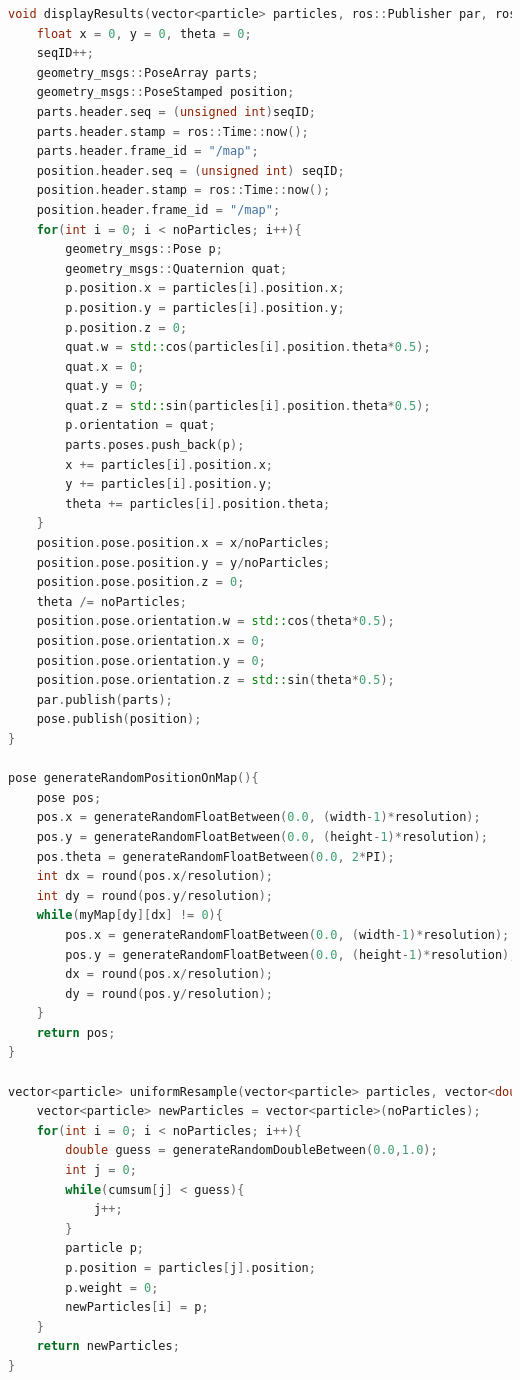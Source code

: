 \documentclass{article}
\begin{document}
\begin{appendices}
\begin{lstlisting}[language=C++]
void displayResults(vector<particle> particles, ros::Publisher par, ros::Publisher pose){
	float x = 0, y = 0, theta = 0;	
	seqID++;
	geometry_msgs::PoseArray parts;
	geometry_msgs::PoseStamped position;
	parts.header.seq = (unsigned int)seqID;
	parts.header.stamp = ros::Time::now();
	parts.header.frame_id = "/map";
	position.header.seq = (unsigned int) seqID;
	position.header.stamp = ros::Time::now();
	position.header.frame_id = "/map";
	for(int i = 0; i < noParticles; i++){
		geometry_msgs::Pose p;
		geometry_msgs::Quaternion quat;
		p.position.x = particles[i].position.x;
		p.position.y = particles[i].position.y;
		p.position.z = 0;
		quat.w = std::cos(particles[i].position.theta*0.5);
		quat.x = 0;
		quat.y = 0;
		quat.z = std::sin(particles[i].position.theta*0.5);
		p.orientation = quat;
		parts.poses.push_back(p);	
		x += particles[i].position.x;
		y += particles[i].position.y;
		theta += particles[i].position.theta;	
	}
	position.pose.position.x = x/noParticles;
	position.pose.position.y = y/noParticles;
	position.pose.position.z = 0;
	theta /= noParticles;
	position.pose.orientation.w = std::cos(theta*0.5);
	position.pose.orientation.x = 0;
	position.pose.orientation.y = 0;
	position.pose.orientation.z = std::sin(theta*0.5);
	par.publish(parts);
	pose.publish(position);
}

pose generateRandomPositionOnMap(){
	pose pos;
	pos.x = generateRandomFloatBetween(0.0, (width-1)*resolution);
	pos.y = generateRandomFloatBetween(0.0, (height-1)*resolution);
	pos.theta = generateRandomFloatBetween(0.0, 2*PI);
	int dx = round(pos.x/resolution);
	int dy = round(pos.y/resolution);
	while(myMap[dy][dx] != 0){
		pos.x = generateRandomFloatBetween(0.0, (width-1)*resolution);
		pos.y = generateRandomFloatBetween(0.0, (height-1)*resolution);	
		dx = round(pos.x/resolution);
		dy = round(pos.y/resolution);
	}
	return pos;	
}

vector<particle> uniformResample(vector<particle> particles, vector<double> cumsum){
	vector<particle> newParticles = vector<particle>(noParticles);
	for(int i = 0; i < noParticles; i++){
		double guess = generateRandomDoubleBetween(0.0,1.0);
		int j = 0;
		while(cumsum[j] < guess){
			j++;			
		}
		particle p;
		p.position = particles[j].position;
		p.weight = 0;
		newParticles[i] = p;
	}
	return newParticles;
}


\end{lstlisting}
\end{appendices}
\end{document}
